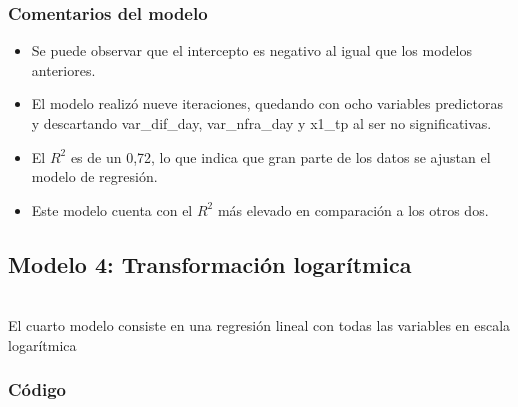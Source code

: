 \documentclass[
	11pt, %
	spanish, %
]{fphw}
\begin{document}
\subsubsection*{Comentarios del modelo}

\begin{itemize}
\item Se puede observar que el intercepto es negativo al igual que los modelos anteriores.
\item El modelo realizó nueve iteraciones, quedando con ocho variables predictoras y descartando var\_dif\_day, var\_nfra\_day y x1\_tp al ser no significativas.
\item El $R^{2}$ es de un 0,72, lo que indica que gran parte de los datos se ajustan el modelo de regresión.
\item Este modelo cuenta con el $R^{2}$ más elevado en comparación a los otros dos.
\end{itemize}

\newpage
\subsection*{Modelo 4: Transformación logarítmica} \hfill \\
El cuarto modelo consiste en una regresión lineal con todas las variables en escala logarítmica

\subsubsection*{Código} \hfill\\

\end{document}

